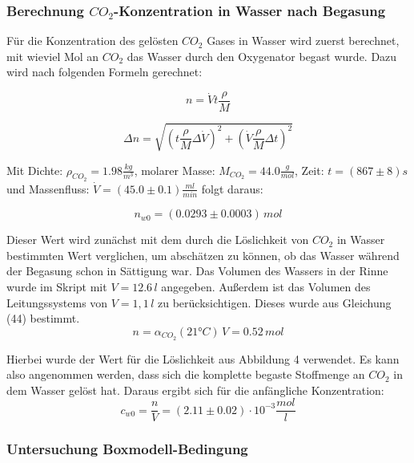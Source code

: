 \documentclass[12pt]{article}
\begin{document}
\subsubsection{Berechnung $CO_2$-Konzentration in Wasser nach Begasung}

Für die Konzentration des gelösten $CO_2$ Gases in Wasser wird zuerst berechnet, mit wieviel Mol an $CO_2$ das Wasser durch den Oxygenator begast wurde. Dazu wird nach folgenden Formeln gerechnet:

\begin{equation}
n = \dot V t \frac{\rho}{M} 
\end{equation}

\begin{equation}
\Delta n = \sqrt{(t \frac{\rho}{M} \Delta \dot V)^{2}+(\dot V \frac{\rho}{M} \Delta t)^{2}}
\end{equation}

Mit Dichte: $\rho_{CO_2} = 1.98 \frac{kg}{m^3} $, molarer Masse: $M_{CO_2} = 44.0\frac{g}{mol} $, Zeit:  $t = (867 \pm 8)s$ und Massenfluss: $\dot V = (45.0 \pm 0.1)\frac{ml}{min}$ folgt daraus:

\begin{equation}
n_{w0} = (0.0293 \pm 0.0003) \,mol
\end{equation}

Dieser Wert wird zun\"achst mit dem durch die Löslichkeit von $CO_2$ in Wasser bestimmten Wert verglichen, um absch\"atzen zu können, ob das Wasser w\"ahrend der Begasung schon in S\"attigung war. Das Volumen des Wassers in der Rinne wurde im Skript mit $V = 12.6 \,l $ angegeben. Außerdem ist das Volumen des Leitungssystems von $V=1,1 \,l $ zu ber\"ucksichtigen. Dieses wurde aus Gleichung (44) \cite{jaehne} bestimmt.
\begin{equation}
n = \alpha_{CO_2}(21 °C) \, V = 0.52 \, mol
\end{equation}

Hierbei wurde der Wert für die L\"oslichkeit aus Abbildung 4 \cite{jaehne} verwendet. Es kann also angenommen werden, dass sich die komplette begaste Stoffmenge an $CO_2$ in dem Wasser gelöst hat. Daraus ergibt sich für die anfängliche Konzentration:
\begin{equation}
c_{w0} = \frac{n}{V} = (2.11 \pm 0.02)\cdot 10^{-3} \frac{mol}{l}
\end{equation}

\subsubsection{Untersuchung Boxmodell-Bedingung}
\end{document}

